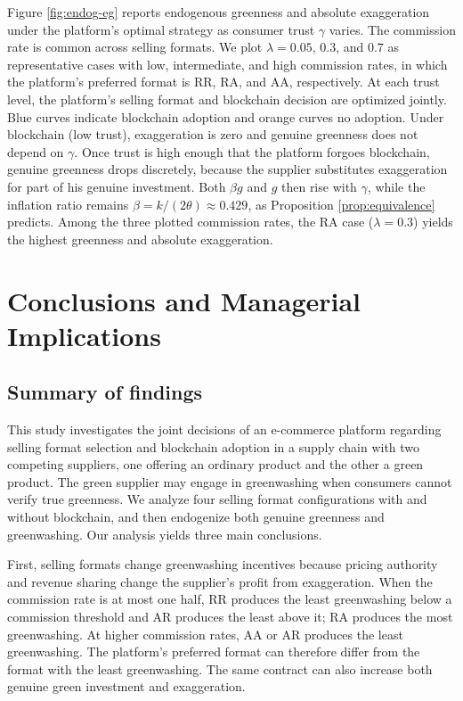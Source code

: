 \documentclass[preprint,review,12pt,authoryear,nopreprintline]{elsarticle}
\theoremstyle{definition}
\begin{document}
Figure \ref{fig:endog-eg} reports endogenous greenness and absolute exaggeration under the platform's optimal strategy as consumer trust $\gamma$ varies. The commission rate is common across selling formats. We plot $\lambda=0.05$, $0.3$, and $0.7$ as representative cases with low, intermediate, and high commission rates, in which the platform's preferred format is RR, RA, and AA, respectively. At each trust level, the platform's selling format and blockchain decision are optimized jointly. Blue curves indicate blockchain adoption and orange curves no adoption. Under blockchain (low trust), exaggeration is zero and genuine greenness does not depend on $\gamma$. Once trust is high enough that the platform forgoes blockchain, genuine greenness drops discretely, because the supplier substitutes exaggeration for part of his genuine investment. Both $\beta g$ and $g$ then rise with $\gamma$, while the inflation ratio remains $\beta=k/(2\theta)\approx0.429$, as Proposition \ref{prop:equivalence} predicts. Among the three plotted commission rates, the RA case ($\lambda=0.3$) yields the highest greenness and absolute exaggeration.

\section{Conclusions and Managerial Implications}\label{sec:6}

\subsection{Summary of findings}

This study investigates the joint decisions of an e-commerce platform regarding selling format selection and blockchain adoption in a supply chain with two competing suppliers, one offering an ordinary product and the other a green product. The green supplier may engage in greenwashing when consumers cannot verify true greenness. We analyze four selling format configurations with and without blockchain, and then endogenize both genuine greenness and greenwashing. Our analysis yields three main conclusions.

First, selling formats change greenwashing incentives because pricing authority and revenue sharing change the supplier's profit from exaggeration. When the commission rate is at most one half, RR produces the least greenwashing below a commission threshold and AR produces the least above it; RA produces the most greenwashing. At higher commission rates, AA or AR produces the least greenwashing. The platform's preferred format can therefore differ from the format with the least greenwashing. The same contract can also increase both genuine green investment and exaggeration.
\end{document}
